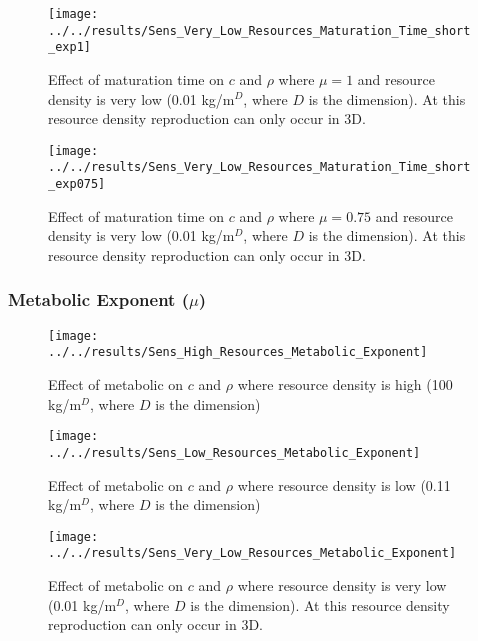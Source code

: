 \begin{refsection}
\begin{figure}[h]
\end{figure}
\begin{figure}[h]
	\centering
	\texttt{[image: ../../results/Sens\_Very\_Low\_Resources\_Maturation\_Time\_short\_exp1]}
	\caption{Effect of maturation time on $c$ and $\rho$ where $\mu = 1$ and resource density is very low (0.01 kg/m$^D$, where $D$ is the dimension).  At this resource density reproduction can only occur in 3D.}
	\label{fig:sensverylowresourcesmaturationtimeshortexp1}
\end{figure}
\begin{figure}[h]
	\centering
	\texttt{[image: ../../results/Sens\_Very\_Low\_Resources\_Maturation\_Time\_short\_exp075]}
	\caption{Effect of maturation time on $c$ and $\rho$ where $\mu = 0.75$ and resource density is very low (0.01 kg/m$^D$, where $D$ is the dimension).  At this resource density reproduction can only occur in 3D.}
	\label{fig:sensverylowresourcesmaturationtimeshortexp075}
\end{figure}




\clearpage
\subsubsection{Metabolic Exponent ($\mu$)}
\begin{figure}[H]
	\centering
	\texttt{[image: ../../results/Sens\_High\_Resources\_Metabolic\_Exponent]}
	\caption{Effect of metabolic on $c$ and $\rho$ where resource density is high (100 kg/m$^D$, where $D$ is the dimension)}
	\label{fig:senshighresourcesmetabolicexponent}
\end{figure}
\begin{figure}[h]
	\centering
	\texttt{[image: ../../results/Sens\_Low\_Resources\_Metabolic\_Exponent]}
	\caption{Effect of metabolic on $c$ and $\rho$ where resource density is low (0.11 kg/m$^D$, where $D$ is the dimension)}
	\label{fig:senslowresourcesmetabolicexponent}
\end{figure}
\begin{figure}[h]
	\centering
	\texttt{[image: ../../results/Sens\_Very\_Low\_Resources\_Metabolic\_Exponent]}
	\caption{Effect of metabolic on $c$ and $\rho$ where resource density is very low (0.01 kg/m$^D$, where $D$ is the dimension).  At this resource density reproduction can only occur in 3D.}
	\label{fig:sensverylowresourcesmetabolicexponent}
\end{figure}




\end{refsection}

